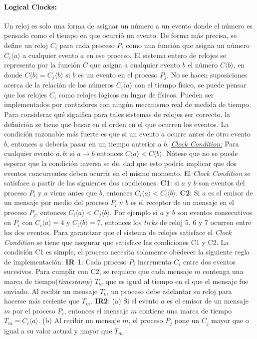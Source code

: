 \paragraph{\textnormal{\textbf{Logical Clocks:}}}
Un reloj es solo una forma de asignar un número a un evento donde el número es pensado como el tiempo en que ocurrió un evento. De forma más precisa, se define un reloj $C_i$ para cada proceso $P_i$ como una función que asigna un número $C_i\langle a \rangle$ a cualquier evento $a$ en ese proceso. El sistema entero de relojes se representa por la función $C$ que asigna a cualquier evento $b$ el número $C\langle b \rangle$, en donde $C\langle b \rangle = C_j\langle b \rangle$ si $b$ es un evento en el proceso $P_j$. No se hacen suposiciones acerca de la relación de los números $C_i\langle a \rangle$ con el tiempo físico, se puede pensar que los relojes $C_i$ como relojes lógicos en lugar de físicos. Pueden ser implementados por contadores con ningún mecanismo real de medida de tiempo. Para considerar qué significa para tales sistemas de relojes ser correcto, la definición se tiene que basar en el orden en el que ocurren los eventos. La condición razonable más fuerte es que si un evento $a$ ocurre antes de otro evento $b$, entonces $a$ debería pasar en un tiempo anterior a $b$. \underline{\emph{Clock Condition:}} Para cualquier evento $a, b$: si $a \to b$ entonces $C\langle a \rangle < C\langle b \rangle$. Nótese que no se puede esperar que la condición inversa se de, dad que esto podría implicar que dos eventos concurrentes deben ocurrir en el mismo momento. El \emph{Clock Condition} se satisface a partir de las siguientes dos condiciones: \textbf{C1}: si $a$ y $b$ son eventos del proceso $P_i$ y $a$ viene antes que $b$, entonces $C_i\langle a \rangle < C_i\langle b \rangle$. \textbf{C2}: Si $a$ es el emisor de un mensaje por medio del proceso $P_i$ y $b$ es el receptor de un mensaje en el proceso $P_j$, entonces $C_i\langle a \rangle < C_j\langle b \rangle$. Por ejemplo si $a$ y $b$ son eventos consecutivos en $P_i$ con $C_i\langle a \rangle = 4$ y $C_i\langle b \rangle = 7$, entonces los \emph{ticks} de reloj 5, 6 y 7 ocurren entre los dos eventos. Para garantizar que el sistema de relojes satisface el \emph{Clock Condition} se tiene que asegurar que satisface las condiciones C1 y C2. La condición C1 es simple, el proceso necesita solamente obedecer la siguiente regla de implementación: \textbf{IR 1}: Cada proceso $P_i$ incrementa $C_i$ entre dos eventos sucesivos. Para cumplir con C2, se requiere que cada mensaje $m$ contenga una marca de tiempo(\emph{timestamp}) $T_m$ que es igual al tiempo en el que el mensaje fue enviado. Al recibir un mensaje $T_m$ un proceso debe adelantar su reloj para hacerse más reciente que $T_m$. \textbf{IR2}: (a) Si el evento $a$ es el emisor de un mensaje $m$ por el proceso $P_i$, entonces el mensaje $m$ contiene una marca de tiempo $T_m = C_i\langle a \rangle$. (b) Al recibir un mensaje $m$, el proceso $P_j$ pone un $C_j$ mayor que o igual a su valor actual y mayor que $T_m$.

